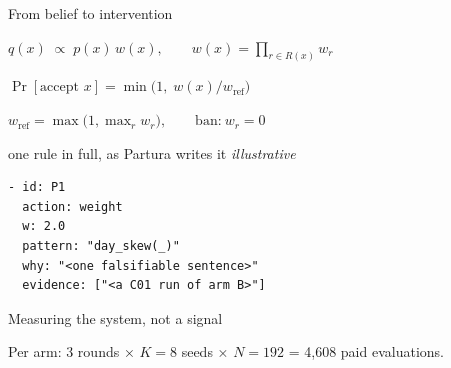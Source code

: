 \documentclass[t,20pt]{beamer}
\newcommand\notesize{\fontsize{14}{17}\selectfont\hyphenpenalty=10000\exhyphenpenalty=10000}
\newcommand\key[1]{{\mediumfont\color{accent}#1}}
\newcommand\gap[1]{\par\vspace{#1}}
\newcommand\colsafter{\par\vspace{-0.24in}}
\newcommand\fig[1]{\par\noindent\makebox[\textwidth][l]{}\par}
\begin{document}
\begin{frame}[fragile]{From belief to intervention}
\fig{figs/bars.tex}
\colsafter
\vspace{0.10in}
\begin{minipage}[t]{5.6in}
\raggedright
\vspace{0pt}
$q(x) \;\propto\; p(x)\, w(x), \qquad w(x) = \prod_{r \in R(x)} w_r$
\gap{0.12in}
$\Pr[\text{accept } x] = \min\!\bigl(1,\; w(x)/w_{\mathrm{ref}}\bigr)$
\gap{0.12in}
$w_{\mathrm{ref}} = \max\bigl(1, \max_r w_r\bigr), \qquad \text{ban:}\ w_r = 0$
\end{minipage}%
\hspace{0.35in}%
\begin{minipage}[t]{5.68in}
\raggedright
\vspace{0pt}
{\notesize\color{sec}one rule in full, as Partura writes it \enspace\itshape illustrative}
\gap{4pt}
\begin{Verbatim}[formatcom=\color{ink}, fontsize=\fontsize{14}{17}\selectfont]
- id: P1
  action: weight
  w: 2.0
  pattern: "day_skew(_)"
  why: "<one falsifiable sentence>"
  evidence: ["<a C01 run of arm B>"]
\end{Verbatim}
\end{minipage}
\end{frame}

\begin{frame}{Measuring the system, not a signal}
\fig{figs/matrix.tex}
\gap{0.22in}
Per arm: 3 rounds × $K = 8$ seeds × $N = 192$ = \key{4,608 paid evaluations}.
\end{frame}
\end{document}
